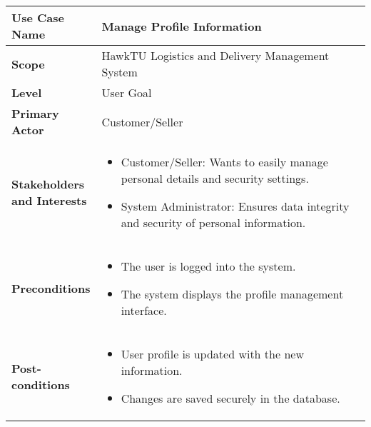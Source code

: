 \documentclass{article}
\begin{document}
\begin{longtable}{|>{\raggedright\arraybackslash}m{0.25\linewidth}|m{0.75\linewidth}|}
\hline
\textbf{Use Case Name} & Manage Profile Information \\
\hline
\textbf{Scope} & HawkTU Logistics and Delivery Management System \\
\hline
\textbf{Level} & User Goal \\
\hline
\textbf{Primary Actor} & Customer/Seller \\
\hline
\textbf{Stakeholders and Interests} & 
\begin{itemize}
    \item Customer/Seller: Wants to easily manage personal details and security settings.
    \item System Administrator: Ensures data integrity and security of personal information.
\end{itemize} \\
\hline
\textbf{Preconditions} & 
\begin{itemize}
    \item The user is logged into the system.
    \item The system displays the profile management interface.
\end{itemize} \\
\hline
\textbf{Post-conditions} & 
\begin{itemize}
    \item User profile is updated with the new information.
    \item Changes are saved securely in the database.
\end{itemize} \\
\hline
\end{longtable}

\vspace{-2.45em}
\end{document}
